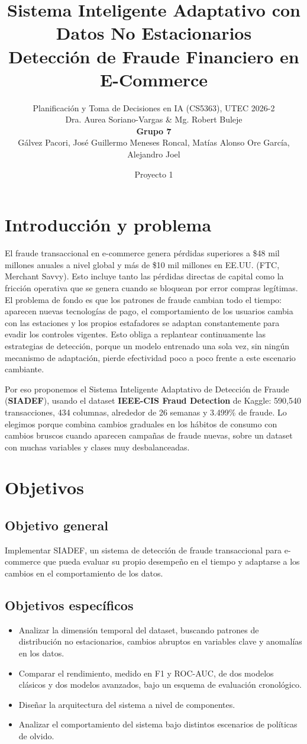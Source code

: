 \documentclass[10pt]{article}
\title{\vspace{-1.5em}\textbf{\LARGE Sistema Inteligente Adaptativo con Datos No Estacionarios}\\[2pt] \large Detección de Fraude Financiero en E-Commerce}
\author{
  \normalsize Planificación y Toma de Decisiones en IA (CS5363), UTEC 2026-2 \\
  \normalsize Dra. Aurea Soriano-Vargas \& Mg. Robert Buleje \\[4pt]
  \normalsize \textbf{Grupo 7} \\[2pt]
  \normalsize Gálvez Pacori, José Guillermo \quad\textbar\quad Meneses Roncal, Matías Alonso \quad\textbar\quad Ore García, Alejandro Joel
}
\date{\normalsize Proyecto 1}
\begin{document}
\maketitle
\vspace{-2.2em}

\section{Introducción y problema}
El fraude transaccional en e-commerce genera pérdidas superiores a \$48 mil millones anuales a nivel global y más de \$10 mil millones en EE.UU. (FTC, Merchant Savvy). Esto incluye tanto las pérdidas directas de capital como la fricción operativa que se genera cuando se bloquean por error compras legítimas. El problema de fondo es que los patrones de fraude cambian todo el tiempo: aparecen nuevas tecnologías de pago, el comportamiento de los usuarios cambia con las estaciones y los propios estafadores se adaptan constantemente para evadir los controles vigentes. Esto obliga a replantear continuamente las estrategias de detección, porque un modelo entrenado una sola vez, sin ningún mecanismo de adaptación, pierde efectividad poco a poco frente a este escenario cambiante.

Por eso proponemos el Sistema Inteligente Adaptativo de Detección de Fraude (\textbf{SIADEF}), usando el dataset \textbf{IEEE-CIS Fraud Detection} de Kaggle: 590{,}540 transacciones, 434 columnas, alrededor de 26 semanas y 3.499\% de fraude. Lo elegimos porque combina cambios graduales en los hábitos de consumo con cambios bruscos cuando aparecen campañas de fraude nuevas, sobre un dataset con muchas variables y clases muy desbalanceadas.

\section{Objetivos}
\subsection*{Objetivo general}
Implementar SIADEF, un sistema de detección de fraude transaccional para e-commerce que pueda evaluar su propio desempeño en el tiempo y adaptarse a los cambios en el comportamiento de los datos.

\subsection*{Objetivos específicos}
\begin{itemize}
  \item Analizar la dimensión temporal del dataset, buscando patrones de distribución no estacionarios, cambios abruptos en variables clave y anomalías en los datos.
  \item Comparar el rendimiento, medido en F1 y ROC-AUC, de dos modelos clásicos y dos modelos avanzados, bajo un esquema de evaluación cronológico.
  \item Diseñar la arquitectura del sistema a nivel de componentes.
  \item Analizar el comportamiento del sistema bajo distintos escenarios de políticas de olvido.
\end{itemize}
\end{document}
